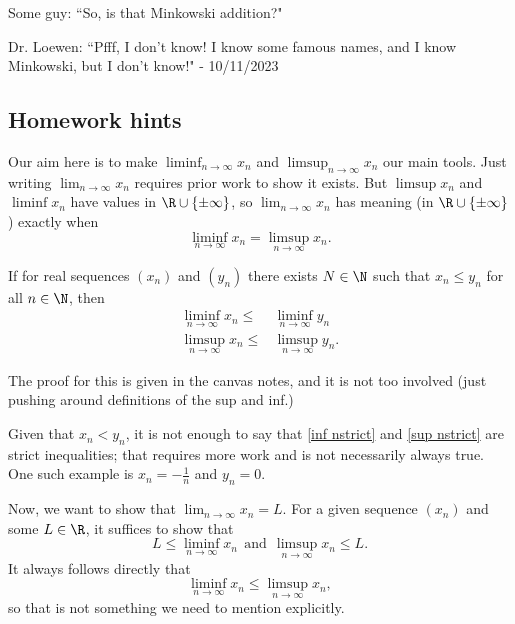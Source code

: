 \begin{nquote}{}
	Some guy: ``So, is that Minkowski addition?"
	
	\medskip
	
	Dr. Loewen: ``Pfff, I don't know! I know some famous names, and I know Minkowski, but I don't know!" - 10/11/2023
\end{nquote}
\subsection*{Homework hints}
Our aim here is to make \(\displaystyle\liminf_{n\to\infty}x_n\) and \(\displaystyle\limsup_{n\to\infty}x_n\) our main tools. Just writing \(\displaystyle\lim_{n\to\infty}x_n\) requires prior work to show it exists. But \(\limsup x_n\) and \(\liminf x_n\) have values in \(\R\cup\{\pm\infty\}\), so \(\displaystyle\lim_{n\to\infty}x_n\) has meaning (in \(\R\cup\{\pm\infty\}\)) exactly when 
\begin{equation*}
	\liminf_{n\to\infty}x_n=\limsup_{n\to\infty}x_n.
\end{equation*}
\begin{nlemma}{}
	If for real sequences \((x_n)\) and \((y_n)\) there exists \(N\in\N\) such that \(x_n\leq y_n\) for all \(n\in\N\), then 
	\begin{align}
		\liminf_{n\to\infty}x_n\leq&\liminf_{n\to\infty}y_n\label{inf nstrict}\\
		\limsup_{n\to\infty}x_n\leq&\limsup_{n\to\infty}y_n\label{sup nstrict}.
	\end{align}
\end{nlemma}
The proof for this is given in the canvas notes, and it is not too involved (just pushing around definitions of the sup and inf.)
\begin{note}
	Given that \(x_n<y_n\), it is not enough to say that \cref{inf nstrict} and \cref{sup nstrict} are strict inequalities; that requires more work and is not necessarily always true. One such example is \(x_n=-\displaystyle\frac{1}{n}\) and \(y_n=0\). 
\end{note}
Now, we want to show that \(\displaystyle\lim_{n\to\infty}x_n=L\). For a given sequence \((x_n)\) and some \(L\in\R\), it suffices to show that 
\begin{equation}
	L\leq \liminf_{n\to\infty}x_n~~\text{and}~~\limsup_{n\to\infty}x_n\leq L\label{L<=liminf limsup<=L}.
\end{equation}
It always follows directly that
\begin{equation*}
	\liminf_{n\to\infty}x_n\leq \limsup_{n\to\infty}x_n,
\end{equation*}
so that is not something we need to mention explicitly.

